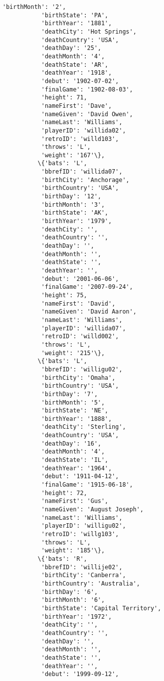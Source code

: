 \documentclass[11pt]{article}
\begin{document}
\begin{Verbatim}[commandchars=\\\{\}]
           'birthMonth': '2',
           'birthState': 'PA',
           'birthYear': '1881',
           'deathCity': 'Hot Springs',
           'deathCountry': 'USA',
           'deathDay': '25',
           'deathMonth': '4',
           'deathState': 'AR',
           'deathYear': '1918',
           'debut': '1902-07-02',
           'finalGame': '1902-08-03',
           'height': 71,
           'nameFirst': 'Dave',
           'nameGiven': 'David Owen',
           'nameLast': 'Williams',
           'playerID': 'willida02',
           'retroID': 'willd103',
           'throws': 'L',
           'weight': '167'\},
          \{'bats': 'L',
           'bbrefID': 'willida07',
           'birthCity': 'Anchorage',
           'birthCountry': 'USA',
           'birthDay': '12',
           'birthMonth': '3',
           'birthState': 'AK',
           'birthYear': '1979',
           'deathCity': '',
           'deathCountry': '',
           'deathDay': '',
           'deathMonth': '',
           'deathState': '',
           'deathYear': '',
           'debut': '2001-06-06',
           'finalGame': '2007-09-24',
           'height': 75,
           'nameFirst': 'David',
           'nameGiven': 'David Aaron',
           'nameLast': 'Williams',
           'playerID': 'willida07',
           'retroID': 'willd002',
           'throws': 'L',
           'weight': '215'\},
          \{'bats': 'L',
           'bbrefID': 'willigu02',
           'birthCity': 'Omaha',
           'birthCountry': 'USA',
           'birthDay': '7',
           'birthMonth': '5',
           'birthState': 'NE',
           'birthYear': '1888',
           'deathCity': 'Sterling',
           'deathCountry': 'USA',
           'deathDay': '16',
           'deathMonth': '4',
           'deathState': 'IL',
           'deathYear': '1964',
           'debut': '1911-04-12',
           'finalGame': '1915-06-18',
           'height': 72,
           'nameFirst': 'Gus',
           'nameGiven': 'August Joseph',
           'nameLast': 'Williams',
           'playerID': 'willigu02',
           'retroID': 'willg103',
           'throws': 'L',
           'weight': '185'\},
          \{'bats': 'R',
           'bbrefID': 'willije02',
           'birthCity': 'Canberra',
           'birthCountry': 'Australia',
           'birthDay': '6',
           'birthMonth': '6',
           'birthState': 'Capital Territory',
           'birthYear': '1972',
           'deathCity': '',
           'deathCountry': '',
           'deathDay': '',
           'deathMonth': '',
           'deathState': '',
           'deathYear': '',
           'debut': '1999-09-12',

\end{Verbatim}
\end{document}
